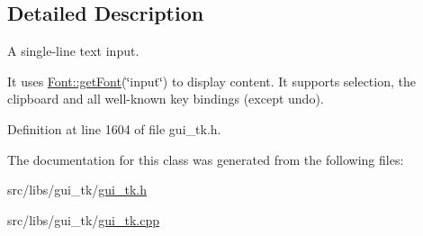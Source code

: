 \subsection{Detailed Description}
A single-\/line text input. 

It uses \hyperlink{classGUI_1_1Font_a19c023d747809a4cfa6142d33bdff53a}{Font\-::get\-Font}(\char`\"{}input\char`\"{}) to display content. It supports selection, the clipboard and all well-\/known key bindings (except undo). 

Definition at line 1604 of file gui\-\_\-tk.\-h.



The documentation for this class was generated from the following files\-:\begin{DoxyCompactItemize}
\item 
src/libs/gui\-\_\-tk/\hyperlink{gui__tk_8h}{gui\-\_\-tk.\-h}\item 
src/libs/gui\-\_\-tk/\hyperlink{gui__tk_8cpp}{gui\-\_\-tk.\-cpp}\end{DoxyCompactItemize}
